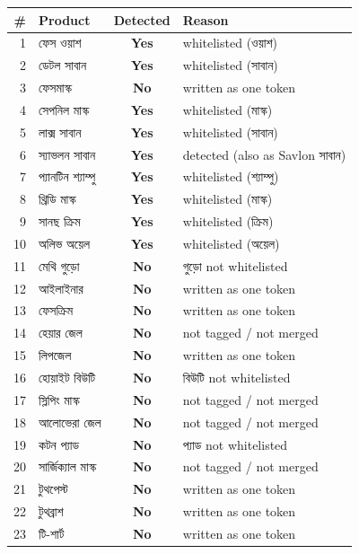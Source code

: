 \documentclass[11pt]{article}
\newcommand{\bn}[1]{{\bnfont #1}}
\newcommand{\yes}{\textcolor{codegreen}{\textbf{Yes}}}
\newcommand{\no}{\textcolor{codered}{\textbf{No}}}
\begin{document}
\begin{center}
\footnotesize
\begin{longtable}{@{}rlcl@{}}
\toprule
\textbf{\#} & \textbf{Product} & \textbf{Detected} & \textbf{Reason} \\
\midrule
\endhead
1  & \bn{ফেস ওয়াশ}         & \yes & whitelisted (\bn{ওয়াশ}) \\
2  & \bn{ডেটল সাবান}        & \yes & whitelisted (\bn{সাবান}) \\
3  & \bn{ফেসমাস্ক}          & \no  & written as one token \\
4  & \bn{সেপনিল মাস্ক}      & \yes & whitelisted (\bn{মাস্ক}) \\
5  & \bn{লাক্স সাবান}       & \yes & whitelisted (\bn{সাবান}) \\
6  & \bn{স্যাভলন সাবান}     & \yes & detected (also as \bn{Savlon সাবান}) \\
7  & \bn{প্যানটিন শ্যাম্পু} & \yes & whitelisted (\bn{শ্যাম্পু}) \\
8  & \bn{থ্রিডি মাস্ক}      & \yes & whitelisted (\bn{মাস্ক}) \\
9  & \bn{সানছ ক্রিম}        & \yes & whitelisted (\bn{ক্রিম}) \\
10 & \bn{অলিভ অয়েল}        & \yes & whitelisted (\bn{অয়েল}) \\
11 & \bn{মেথি গুড়ো}        & \no  & \bn{গুড়ো} not whitelisted \\
12 & \bn{আইলাইনার}          & \no  & written as one token \\
13 & \bn{ফেসক্রিম}          & \no  & written as one token \\
14 & \bn{হেয়ার জেল}        & \no  & not tagged / not merged \\
15 & \bn{লিপজেল}            & \no  & written as one token \\
16 & \bn{হোয়াইট বিউটি}     & \no  & \bn{বিউটি} not whitelisted \\
17 & \bn{স্লিপিং মাস্ক}     & \no  & not tagged / not merged \\
18 & \bn{আলোভেরা জেল}       & \no  & not tagged / not merged \\
19 & \bn{কটন প্যাড}         & \no  & \bn{প্যাড} not whitelisted \\
20 & \bn{সার্জিক্যাল মাস্ক} & \no  & not tagged / not merged \\
21 & \bn{টুথপেস্ট}          & \no  & written as one token \\
22 & \bn{টুথব্রাশ}          & \no  & written as one token \\
23 & \bn{টি-শার্ট}          & \no  & written as one token \\

\end{longtable}
\end{center}
\end{document}
